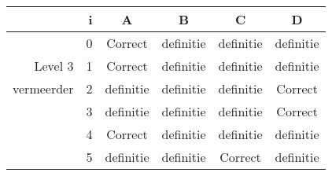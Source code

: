 \begin{tabular}{ rr| c|c|c|c}\hline\hline
     & i & \textbf{A} & \textbf{B} & \textbf{C} & \textbf{D}\\\hline

&0&Correct\cellcolor[gray]{0.6}&definitie&definitie&definitie\\
Level 3 & 1&Correct\cellcolor[gray]{0.6}&definitie&definitie&definitie\\
vermeerder &2&definitie&definitie&definitie&Correct\cellcolor[gray]{0.6}\\
&3&definitie&definitie&definitie&Correct\cellcolor[gray]{0.6}\\
&4&Correct\cellcolor[gray]{0.6}&definitie&definitie&definitie\\
&5&definitie&definitie&Correct\cellcolor[gray]{0.6}&definitie\\
\hline\end{tabular}\par\ \newline

